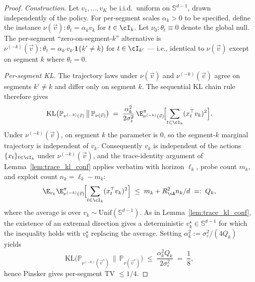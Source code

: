 \begin{proof}
\emph{Construction.} Let $v_1,\dots,v_K$ be i.i.d.\ uniform on
$\mathbb S^{d-1}$, drawn independently of the policy. For
per-segment scales $\alpha_k>0$ to be specified, define the instance
$\nu(\vec v):\theta_t = \alpha_k v_k$ for $t\in\cI_k$. Let
$\nu_0:\theta_t\equiv 0$ denote the global null. The per-segment
``zero-on-segment-$k$'' alternative is
$\nu^{(-k)}(\vec v):\theta_t = \alpha_{k'}v_{k'}\mathbf 1\{k'\ne k\}$
for $t\in\cI_{k'}$ — i.e., identical to $\nu(\vec v)$ except on
segment $k$ where $\theta_t=0$.

\emph{Per-segment KL.} The trajectory laws under $\nu(\vec v)$ and
$\nu^{(-k)}(\vec v)$ agree on segments $k'\ne k$ and differ only on
segment $k$. The sequential KL chain rule therefore gives
\[
\mathrm{KL}\bigl(\mathbb P_{\nu^{(-k)}(\vec v)}\,\bigl\|\,\mathbb P_{\nu(\vec v)}\bigr)
\;=\; \frac{\alpha_k^2}{2\sigma_\varepsilon^2}\,
\E^\pi_{\nu^{(-k)}(\vec v)}\!\Bigl[\sum_{t\in\cI_k}(x_t^\top v_k)^2\Bigr].
\]
Under $\nu^{(-k)}(\vec v)$, on segment $k$ the parameter is $0$, so
the segment-$k$ marginal trajectory is independent of $v_k$.
Consequently $v_k$ is independent of the actions $\{x_t\}_{t\in\cI_k}$
under $\nu^{(-k)}(\vec v)$, and the trace-identity argument of
Lemma~\ref{lem:trace_kl_conf} applies verbatim with horizon $\ell_k$,
probe count $m_k$, and exploit count $n_k=\ell_k-m_k$:
\[
\E_{v_k}\E^\pi_{\nu^{(-k)}(\vec v)}\!\Bigl[\sum_{t\in\cI_k}(x_t^\top v_k)^2\Bigr]
\;\le\; m_k + R_\cA^2 n_k/d \;=:\;Q_k,
\]
where the average is over $v_k\sim\mathrm{Unif}(\mathbb S^{d-1})$. As in
Lemma~\ref{lem:trace_kl_conf}, the existence of an extremal direction
gives a deterministic $v_k^\star\in\mathbb S^{d-1}$ for which the
inequality holds with $v_k^\star$ replacing the average. Setting
$\alpha_k^2 := \sigma_\varepsilon^2/(4 Q_k)$ yields
\[
\mathrm{KL}\bigl(\mathbb P_{\nu^{(-k)}(\vec v^\star)}\,\bigl\|\,\mathbb P_{\nu(\vec v^\star)}\bigr)
\;\le\;\frac{\alpha_k^2 Q_k}{2\sigma_\varepsilon^2}\;=\;\frac{1}{8},
\]
hence Pinsker gives per-segment TV $\le 1/4$.


\end{proof}

